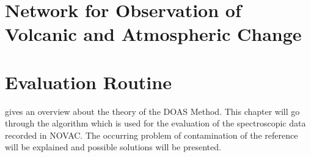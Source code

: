 \documentclass  [
  paper    = a4,
  BCOR     = 10mm,
  twoside,
  fontsize = 12pt,
  fleqn,
  toc      = bibnumbered,
  toc      = listofnumbered,
  numbers  = noendperiod,
  headings = normal,
  listof   = leveldown,
  version  = 3.03
]                                       {scrreprt}
\begin{document}
	
	\chapter{Network for Observation of Volcanic and Atmospheric Change \label{NOVAC}}
	
	
	\chapter{Evaluation Routine}
		 gives an overview about the theory of the DOAS Method. This chapter will go through the algorithm which is used for the evaluation of the spectroscopic data recorded in NOVAC. 
		The occurring problem of contamination of the reference will be explained and possible solutions will be presented.
		 
\end{document}
